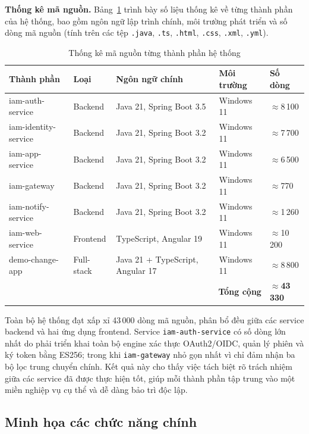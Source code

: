 \documentclass[../DoAn.tex]{subfiles}
\begin{document}
\textbf{Thống kê mã nguồn.} Bảng~\ref{tab:service-stats} trình bày số liệu thống kê về từng thành phần của hệ thống, bao gồm ngôn ngữ lập trình chính, môi trường phát triển và số dòng mã nguồn (tính trên các tệp \texttt{.java}, \texttt{.ts}, \texttt{.html}, \texttt{.css}, \texttt{.xml}, \texttt{.yml}).

\begin{table}[H]
\centering
\caption{Thống kê mã nguồn từng thành phần hệ thống}
\label{tab:service-stats}
\footnotesize
\begin{tabular}{|p{3.5cm}|p{2.0cm}|p{3.0cm}|p{2.2cm}|p{1.8cm}|}
\hline
\textbf{Thành phần} & \textbf{Loại} & \textbf{Ngôn ngữ chính} & \textbf{Môi trường} & \textbf{Số dòng} \\ \hline
iam-auth-service & Backend & Java 21, Spring Boot 3.5 & Windows 11 & $\approx$8\,100 \\ \hline
iam-identity-service & Backend & Java 21, Spring Boot 3.2 & Windows 11 & $\approx$7\,700 \\ \hline
iam-app-service & Backend & Java 21, Spring Boot 3.2 & Windows 11 & $\approx$6\,500 \\ \hline
iam-gateway & Backend & Java 21, Spring Boot 3.2 & Windows 11 & $\approx$770 \\ \hline
iam-notify-service & Backend & Java 21, Spring Boot 3.2 & Windows 11 & $\approx$1\,260 \\ \hline
iam-web-service & Frontend & TypeScript, Angular 19 & Windows 11 & $\approx$10\,200 \\ \hline
demo-change-app & Full-stack & Java 21 + TypeScript, Angular 17 & Windows 11 & $\approx$8\,800 \\ \hline
\multicolumn{4}{|r|}{\textbf{Tổng cộng}} & \textbf{$\approx$43\,330} \\ \hline
\end{tabular}
\end{table}

Toàn bộ hệ thống đạt xấp xỉ 43\,000 dòng mã nguồn, phân bổ đều giữa các service backend và hai ứng dụng frontend. Service \texttt{iam-auth-service} có số dòng lớn nhất do phải triển khai toàn bộ engine xác thực OAuth2/OIDC, quản lý phiên và ký token bằng ES256; trong khi \texttt{iam-gateway} nhỏ gọn nhất vì chỉ đảm nhận ba bộ lọc trung chuyển chính. Kết quả này cho thấy việc tách biệt rõ trách nhiệm giữa các service đã được thực hiện tốt, giúp mỗi thành phần tập trung vào một miền nghiệp vụ cụ thể và dễ dàng bảo trì độc lập.

\subsection{Minh họa các chức năng chính}
\end{document}
